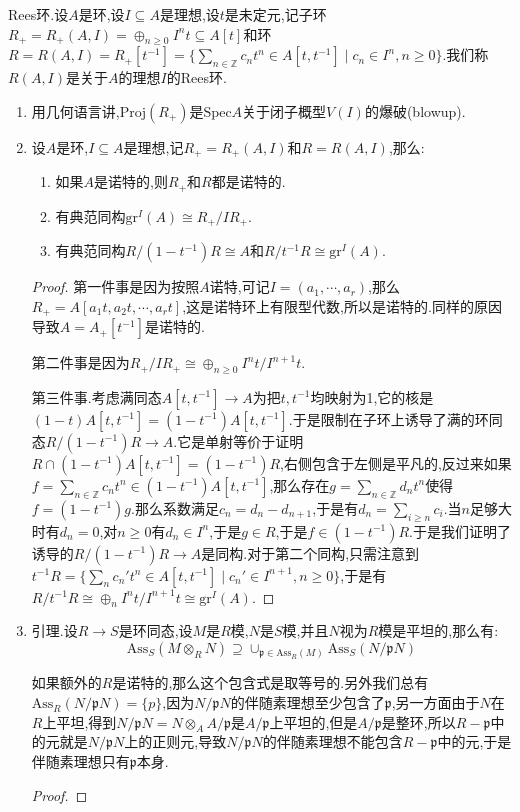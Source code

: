 Rees环.设$A$是环,设$I\subseteq A$是理想,设$t$是未定元,记子环$R_+=R_+(A,I)=\oplus_{n\ge0}I^nt\subseteq A[t]$和环$R=R(A,I)=R_+[t^{-1}]=\{\sum_{n\in\mathbb{Z}}c_nt^n\in A[t,t^{-1}]\mid c_n\in I^n,n\ge0\}$.我们称$R(A,I)$是关于$A$的理想$I$的Rees环.
\begin{enumerate}
	\item 用几何语言讲,$\mathrm{Proj}(R_+)$是$\mathrm{Spec}A$关于闭子概型$V(I)$的爆破(blowup).
	\item 设$A$是环,$I\subseteq A$是理想,记$R_+=R_+(A,I)$和$R=R(A,I)$,那么:
	\begin{enumerate}
		\item 如果$A$是诺特的,则$R_+$和$R$都是诺特的.
		\item 有典范同构$\mathrm{gr}^I(A)\cong R_+/IR_+$.
		\item 有典范同构$R/(1-t^{-1})R\cong A$和$R/t^{-1}R\cong\mathrm{gr}^I(A)$.
	\end{enumerate}
    \begin{proof}
    	
    	第一件事是因为按照$A$诺特,可记$I=(a_1,\cdots,a_r)$,那么$R_+=A[a_1t,a_2t,\cdots,a_rt]$,这是诺特环上有限型代数,所以是诺特的.同样的原因导致$A=A_+[t^{-1}]$是诺特的.
    	
    	\qquad
    	
    	第二件事是因为$R_+/IR_+\cong\oplus_{n\ge0}I^nt/I^{n+1}t$.
    	
    	\qquad
    	
    	第三件事.考虑满同态$A[t,t^{-1}]\to A$为把$t,t^{-1}$均映射为1,它的核是$(1-t)A[t,t^{-1}]=(1-t^{-1})A[t,t^{-1}]$.于是限制在子环上诱导了满的环同态$R/(1-t^{-1})R\to A$.它是单射等价于证明$R\cap(1-t^{-1})A[t,t^{-1}]=(1-t^{-1})R$,右侧包含于左侧是平凡的,反过来如果$f=\sum_{n\in\mathbb{Z}}c_nt^n\in(1-t^{-1})A[t,t^{-1}]$,那么存在$g=\sum_{n\in\mathbb{Z}}d_nt^n$使得$f=(1-t^{-1})g$.那么系数满足$c_n=d_n-d_{n+1}$,于是有$d_n=\sum_{i\ge n}c_i$.当$n$足够大时有$d_n=0$,对$n\ge0$有$d_n\in I^n$,于是$g\in R$,于是$f\in (1-t^{-1})R$.于是我们证明了诱导的$R/(1-t^{-1})R\to A$是同构.对于第二个同构,只需注意到$t^{-1}R=\{\sum_nc_n't^n\in A[t,t^{-1}]\mid c_n'\in I^{n+1},n\ge0\}$,于是有$R/t^{-1}R\cong\oplus_nI^nt/I^{n+1}t\cong\mathrm{gr}^I(A)$.
    \end{proof}
    \item 引理.设$R\to S$是环同态,设$M$是$R$模,$N$是$S$模,并且$N$视为$R$模是平坦的,那么有:
    $$\mathrm{Ass}_S(M\otimes_RN)\supseteq\cup_{\mathfrak{p}\in\mathrm{Ass}_R(M)}\mathrm{Ass}_S(N/\mathfrak{p}N)$$
    
    如果额外的$R$是诺特的,那么这个包含式是取等号的.另外我们总有$\mathrm{Ass}_R(N/\mathfrak{p}N)=\{p\}$,因为$N/\mathfrak{p}N$的伴随素理想至少包含了$\mathfrak{p}$,另一方面由于$N$在$R$上平坦,得到$N/\mathfrak{p}N=N\otimes_AA/\mathfrak{p}$是$A/\mathfrak{p}$上平坦的,但是$A/\mathfrak{p}$是整环,所以$R-\mathfrak{p}$中的元就是$N/\mathfrak{p}N$上的正则元,导致$N/\mathfrak{p}N$的伴随素理想不能包含$R-\mathfrak{p}$中的元,于是伴随素理想只有$\mathfrak{p}$本身.
    \begin{proof}
    	

\end{proof}
\end{enumerate}
